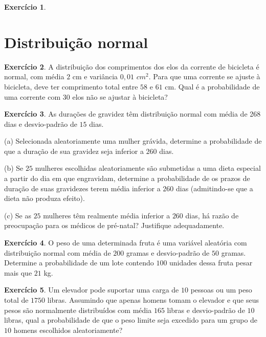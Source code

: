 \documentclass[12pt,a4paper]{article}
\theoremstyle{definition}
\newtheorem{exercise}{Exercício}
\begin{document}
\begin{exercise}
\end{exercise}


\clearpage
\section{Distribuição normal}

\begin{exercise}
A distribuição dos comprimentos dos elos da corrente de bicicleta 
é normal, com média $2$ cm e variância $0,01$ $cm^{2}$. Para que
uma corrente se ajuste à bicicleta, deve ter comprimento total entre $58$
e $61$ cm. Qual é a probabilidade de uma corrente com $30$ elos não
se ajustar à bicicleta?
\end{exercise}

\begin{exercise}
As durações de gravidez têm distribuição normal com
média de 268 dias e desvio-padrão de $15$ dias.

(a) Selecionada aleatoriamente uma mulher grávida, determine a
probabilidade de que a duração de sua gravidez seja inferior a $260$
dias.

(b) Se $25$ mulheres escolhidas aleatoriamente são submetidas a uma
dieta especial a partir do dia em que engravidam, determine a probabilidade
de os prazos de duração de suas gravidezes terem média inferior
a $260$ dias (admitindo-se que a dieta não produza efeito).

(c) Se as $25$ mulheres têm realmente média inferior a $260$ dias,
há razão de preocupação para os médicos de pré-natal?
Justifique adequadamente.
\end{exercise}

\begin{exercise}
O peso de uma determinada fruta é uma variável aleatória com
distribuição normal com média de $200$ gramas e desvio-padrão de
$50$ gramas. Determine a probabilidade de um lote contendo $100$
unidades dessa fruta pesar mais que $21$ kg.
\end{exercise}

\begin{exercise}
Um elevador pode suportar uma carga de $10$ pessoas ou um peso total de $1750 $
libras. Assumindo que apenas homens tomam o elevador e que seus pesos
são normalmente distribuídos com média $165$ libras e
desvio-padrão de $10$ libras, qual a probabilidade de que o peso limite
seja excedido para um grupo de $10$ homens escolhidos aleatoriamente?
\end{exercise}
\end{document}
